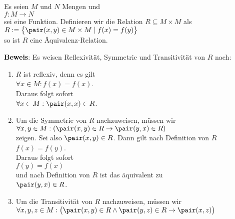 \begin{Satz} Es seien $M$ und $N$ Mengen und 
\\[0.2cm]
\hspace*{1.3cm}
$f : M \rightarrow N$
\\[0.2cm]
sei eine Funktion.  Definieren wir die Relation $R \subseteq M \times M$ als
\\[0.2cm]
\hspace*{1.3cm}
$R := \bigl\{ \pair(x,y) \in M \times M \mid f(x) = f(y) \bigr\}$
\\[0.2cm]
so ist $R$ eine Äquivalenz-Relation.
\end{Satz}

\noindent
\textbf{Beweis}: Es weisen Reflexivität, Symmetrie und Transitivität von $R$ nach:
\begin{enumerate}
\item $R$ ist reflexiv, denn es gilt 
      \\[0.2cm]
      \hspace*{1.3cm}
      $\forall x \in M: f(x) = f(x)$.
      \\[0.2cm]
      Daraus folgt sofort 
      \\[0.2cm]
      \hspace*{1.3cm}
      $\forall x \in M: \pair(x,x) \in R$.
\item Um die Symmetrie von $R$ nachzuweisen, müssen wir
      \\[0.2cm]
      \hspace*{1.3cm}
      $\forall x,y \in M: (\pair(x,y) \in R \rightarrow \pair(y,x) \in R)$
      \\[0.2cm]
      zeigen.  Sei also $\pair(x,y) \in R$. Dann gilt nach Definition von $R$
      \\[0.2cm]
      \hspace*{1.3cm}
      $f(x) = f(y)$.
      \\[0.2cm]
      Daraus folgt sofort 
      \\[0.2cm]
      \hspace*{1.3cm}
      $f(y) = f(x)$
      \\[0.2cm]
      und nach Definition von $R$ ist das äquivalent zu 
      \\[0.2cm]
      \hspace*{1.3cm}
      $\pair(y,x) \in R$.
\item Um die Transitivität von $R$ nachzuweisen, müssen wir 
      \\[0.2cm]
      \hspace*{1.3cm}
      $\forall x,y,z \in M: \bigl(\pair(x,y) \in R \wedge \pair(y,z) \in R \rightarrow \pair(x,z)\bigr)$

\end{enumerate}

